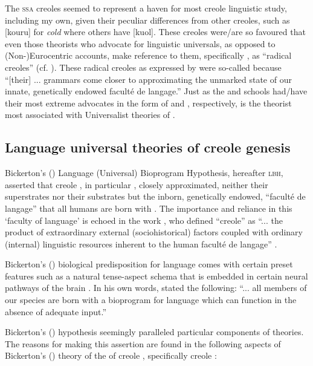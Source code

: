 The \textsc{ssa} creoles seemed to represent a haven for most creole linguistic study, including my own, given their peculiar differences from other  creoles, such as [kouru] for \textit{cold} where others have [kuol]. These creoles were/are so favoured that even those theorists who advocate for linguistic universals, as opposed to (Non-)Eurocentric accounts, make reference to them, specifically , as ``radical creoles'' (cf. \citealt{Bickerton77, Bickerton81, Bickerton84, Bickerton99}). These radical creoles as expressed by  \citet[3]{Byrne87} were so-called because ``[their] ... grammars come closer to approximating the unmarked state of our innate, genetically endowed facult\'{e} de langage.'' Just as the  and  schools had/have their most extreme advocates in the form of \citet{Chaudenson01} and  \citet{Alleyne80}, respectively,  \citet{Bickerton77, Bickerton81, Bickerton84, Bickerton99} is the theorist most associated with Universalist theories of .

\subsection {Language universal theories of creole genesis} \label{2.2.3}
Bickerton's (\citeyear{Bickerton77, Bickerton81, Bickerton84, Bickerton99}) Language (Universal) Bioprogram Hypothesis, hereafter \textsc{lbh}, asserted that creole , in particular , closely approximated, neither their superstrates nor their substrates but the inborn, genetically endowed, ``facult\'{e} de langage'' that all humans are born with \citep[158]{Bickerton84}. The importance and reliance in this `faculty of language' is echoed in the work \citet{DeGraff01}, who defined ``creole'' as ``... the product of extraordinary external (sociohistorical) factors coupled with ordinary (internal) linguistic resources inherent to the human facult\'{e} de langage'' \citep[11]{DeGraff01}.

Bickerton's (\citeyear{Bickerton77, Bickerton81, Bickerton84, Bickerton99}) biological predisposition for language comes with certain preset features such as a natural tense-aspect schema that is embedded in certain neural pathways of the brain  \citep{Bickerton75}. In his own words,  \citet[2]{Bickerton81} stated the following: ``... all members of our species are born with a bioprogram for language which can function in the absence of adequate input.''

Bickerton's (\citeyear{Bickerton77, Bickerton81, Bickerton84, Bickerton99}) hypothesis seemingly paralleled particular components of  theories. The reasons for making this assertion are found in the following aspects of Bickerton's (\citeyear{Bickerton77, Bickerton81, Bickerton84, Bickerton99}) theory of the  of creole , specifically  creole :

